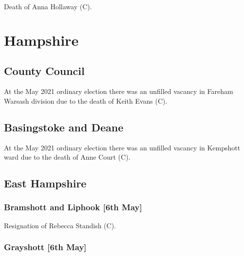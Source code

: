 \documentclass[a4paper,openany]{book}
\begin{document}
\begin{resultsiii}

Death of Anna Hollaway (C).

\section{Hampshire}

\subsection*{County Council}

At the May 2021 ordinary election there was an unfilled vacancy in Fareham Warsash division due to the death of Keith Evans (C).

\subsection*{Basingstoke and Deane}

At the May 2021 ordinary election there was an unfilled vacancy in Kempshott ward due to the death of Anne Court (C).

\subsection*{East Hampshire}

\subsubsection*{Bramshott and Liphook \hspace*{\fill}\nolinebreak[1]%
	\enspace\hspace*{\fill}
	[6th May]}


Resignation of Rebecca Standish (C).

\subsubsection*{Grayshott \hspace*{\fill}\nolinebreak[1]%
	\enspace\hspace*{\fill}
	[6th May]}



\end{resultsiii}
\end{document}
